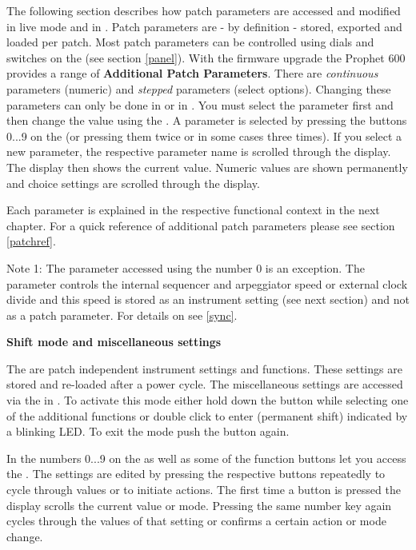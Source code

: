 \documentclass[landscape, 11pt, oneside]{report}
\newenvironment{flowtext}{\addmargin[0cm]{7cm}}{\endaddmargin} %
\begin{document}
\begin{flowtext}
The following section describes how patch parameters are accessed and modified in live mode and in \presetpanel. Patch parameters are - by definition - stored, exported and loaded per patch. Most patch parameters can be controlled using dials and switches on the \panel (see section \ref{panel}). With the firmware upgrade the Prophet 600 provides a range of \textbf{Additional Patch Parameters}. There are \textit{continuous} parameters (numeric) and \textit{stepped} parameters (select options). Changing these parameters can only be done in \presetpanel or in \livemode. You must select the parameter first and then change the value using the \datadial. A parameter is selected by pressing the buttons 0...9 on the \termnumberpad (or pressing them twice or in some cases three times). If you select a new parameter, the respective parameter name is scrolled through the display. The display then shows the current value. Numeric values are shown permanently and choice settings are scrolled through the display. 

Each parameter is explained in the respective functional context in the next chapter. For a quick reference of additional patch parameters please see section \ref{patchref}. 

Note 1: The parameter accessed using the number 0 is an exception. The parameter \clock controls the internal sequencer and arpeggiator speed or external clock divide and this speed is stored as an instrument setting (see next section) and not as a patch parameter. For details on \clock see \ref{sync}.


\textbf{Shift mode and miscellaneous settings}

The \miscsett are patch independent instrument settings and functions. These settings are stored and re-loaded after a power cycle. The miscellaneous settings are accessed via the \termnumberpad in \shiftmode. To activate this mode either hold down the button \fromtape while selecting one of the additional functions or double click \fromtape to enter \shiftlock (permanent shift) indicated by a blinking \fromtape LED. To exit the mode push the button again. 

In \shiftmode the numbers 0...9 on the \termnumberpad as well as some of the function buttons let you access the \miscsett. The settings are edited by pressing the respective buttons repeatedly to cycle through values or to initiate actions. The first time a button is pressed the display scrolls the current value or mode. Pressing the same number key again cycles through the values of that setting or confirms a certain action or mode change. 


\end{flowtext}
\end{document}
